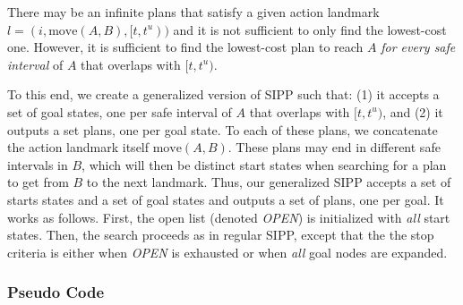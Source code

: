 \documentclass[letterpaper]{article} %
\newcommand{\ccbs}{\ac{CCBS}\xspace}
\newcommand{\ccbsds}{\ac{CCBS-DS}\xspace}
\newcommand{\sipp}{\ac{SIPP}\xspace}
\newcommand{\open}{\textit{OPEN}\xspace}
\begin{document}
 There may be an infinite plans that satisfy a given action landmark $l=(i, \text{move}(A,B), [t,t^u))$ and it is not sufficient to only find the lowest-cost one. 
 However, it is sufficient to find the lowest-cost plan to reach $A$ \emph{for every safe interval} of $A$ that overlaps with $[t,t^u)$.  
 
 
 To this end, we create a generalized version of \sipp such that: 
 (1)  it accepts a set of goal states, one per safe interval of $A$ that overlaps with $[t,t^u)$, 
 and (2) it outputs a set  plans, one per goal state. 
 To each of these plans, we concatenate the  action landmark itself $\text{move}(A,B)$. 
 These plans may end in different safe intervals in $B$, which will then be distinct start states when searching for a plan to get from $B$ to the next landmark. 
Thus, our generalized \sipp accepts a set of starts states and a set of goal states and outputs a set of plans, one per goal. 
It works as follows. 
First, the open list (denoted \open) is initialized with 
\emph{all} start states. 
Then, the search proceeds as in regular \sipp, except that the the stop criteria is either when \open is exhausted or when \emph{all} goal nodes are expanded. 




\subsubsection{Pseudo Code}
\end{document}
